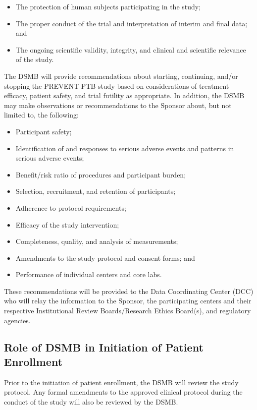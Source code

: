 \documentclass[12pt]{article}
\begin{document}
\begin{itemize}
\item The protection of human subjects participating in the study; 
\item The proper conduct of the trial and interpretation of interim and final data; and
\item The ongoing scientific validity, integrity, and clinical and scientific relevance of the study.
\end{itemize}


The DSMB will provide recommendations about starting, continuing, and/or 
stopping the PREVENT PTB study based on considerations of treatment 
efficacy, patient safety, and trial futility as appropriate. In addition, 
the DSMB may make observations or recommendations to the Sponsor about, but 
not limited to, the following:

\begin{itemize}
\item Participant safety;
\item Identification of and responses to serious adverse events and patterns in serious adverse events;
\item Benefit/risk ratio of procedures and participant burden;
\item Selection, recruitment, and retention of participants;
\item Adherence to protocol requirements;
\item Efficacy of the study intervention;
\item Completeness, quality, and analysis of measurements;
\item Amendments to the study protocol and consent forms; and
\item Performance of individual centers and core labs.
\end{itemize}

These recommendations will be provided to the Data Coordinating Center (DCC) 
who will relay the information to the Sponsor, the participating centers and 
their respective Institutional Review Boards/Research Ethics Board(s), and 
regulatory agencies.



\subsection{Role of DSMB in Initiation of Patient Enrollment}
Prior to the initiation of patient enrollment, the DSMB will review the 
study protocol.  Any formal amendments to the approved clinical protocol 
during the conduct of the study will also be reviewed by the DSMB.
\end{document}

